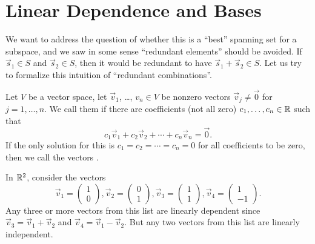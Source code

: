 \section{Linear Dependence and Bases}

\M
We want to address the question of whether this is a ``best'' spanning
set for a subspace, and we saw in some sense ``redundant elements''
should be avoided. If $\vec{s}_{1}\in S$ and $\vec{s}_{2}\in S$, then it
would be redundant to have $\vec{s}_{1}+\vec{s}_{2}\in S$. Let us try to
formalize this intuition of ``redundant combinations''.

\begin{definition}\label{defn:basis:linearly-dependent}
Let $V$ be a vector space, let $\vec{v}_{1}$, \dots, $v_{n}\in V$ be
nonzero vectors $\vec{v}_{j}\neq\vec{0}$ for $j=1,\dots,n$.
We call them  if there are coefficients (not
all zero) $c_{1},\dots,c_{n}\in\mathbb{R}$ such that
\begin{equation}
c_{1}\vec{v}_{1} + c_{2}\vec{v}_{2}+\cdots+c_{n}\vec{v}_{n}=\vec{0}.
\end{equation}
If the only solution for this is $c_{1}=c_{2}=\cdots=c_{n}=0$ for all
coefficients to be zero, then we call the vectors .
\end{definition}

\begin{example}
  In $\mathbb{R}^{2}$, consider the vectors
  \begin{equation}
\vec{v}_{1} = \begin{pmatrix} 1\\0 \end{pmatrix},
\vec{v}_{2} = \begin{pmatrix} 0\\1 \end{pmatrix},
\vec{v}_{3} = \begin{pmatrix} 1\\1 \end{pmatrix},
\vec{v}_{4} = \begin{pmatrix} 1\\-1 \end{pmatrix}.
  \end{equation}
  Any three or more vectors from this list are linearly dependent since
  $\vec{v}_{3}=\vec{v}_{1}+\vec{v}_{2}$ and
  $\vec{v}_{4}=\vec{v}_{1}-\vec{v}_{2}$. But
  any two vectors from this list are linearly independent.
\end{example}

